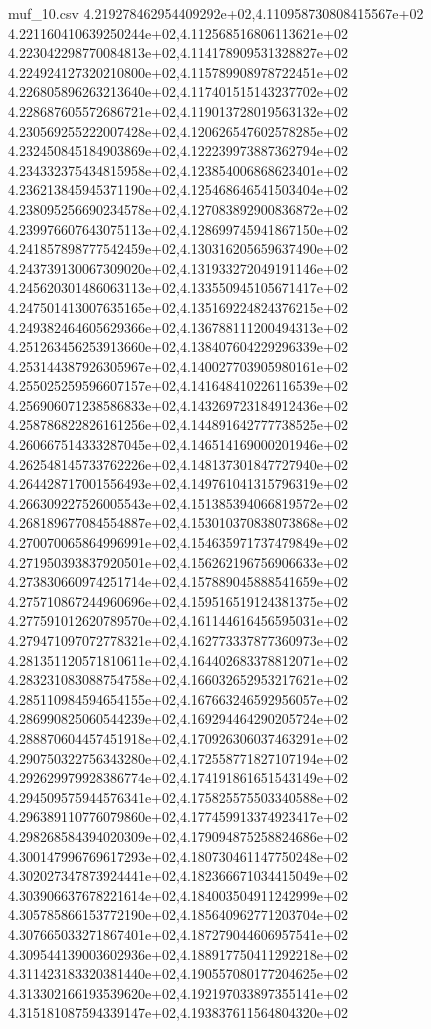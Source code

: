 \begin{filecontents*}{muf_10.csv}
4.219278462954409292e+02,4.110958730808415567e+02
4.221160410639250244e+02,4.112568516806113621e+02
4.223042298770084813e+02,4.114178909531328827e+02
4.224924127320210800e+02,4.115789908978722451e+02
4.226805896263213640e+02,4.117401515143237702e+02
4.228687605572686721e+02,4.119013728019563132e+02
4.230569255222007428e+02,4.120626547602578285e+02
4.232450845184903869e+02,4.122239973887362794e+02
4.234332375434815958e+02,4.123854006868623401e+02
4.236213845945371190e+02,4.125468646541503404e+02
4.238095256690234578e+02,4.127083892900836872e+02
4.239976607643075113e+02,4.128699745941867150e+02
4.241857898777542459e+02,4.130316205659637490e+02
4.243739130067309020e+02,4.131933272049191146e+02
4.245620301486063113e+02,4.133550945105671417e+02
4.247501413007635165e+02,4.135169224824376215e+02
4.249382464605629366e+02,4.136788111200494313e+02
4.251263456253913660e+02,4.138407604229296339e+02
4.253144387926305967e+02,4.140027703905980161e+02
4.255025259596607157e+02,4.141648410226116539e+02
4.256906071238586833e+02,4.143269723184912436e+02
4.258786822826161256e+02,4.144891642777738525e+02
4.260667514333287045e+02,4.146514169000201946e+02
4.262548145733762226e+02,4.148137301847727940e+02
4.264428717001556493e+02,4.149761041315796319e+02
4.266309227526005543e+02,4.151385394066819572e+02
4.268189677084554887e+02,4.153010370838073868e+02
4.270070065864996991e+02,4.154635971737479849e+02
4.271950393837920501e+02,4.156262196756906633e+02
4.273830660974251714e+02,4.157889045888541659e+02
4.275710867244960696e+02,4.159516519124381375e+02
4.277591012620789570e+02,4.161144616456595031e+02
4.279471097072778321e+02,4.162773337877360973e+02
4.281351120571810611e+02,4.164402683378812071e+02
4.283231083088754758e+02,4.166032652953217621e+02
4.285110984594654155e+02,4.167663246592956057e+02
4.286990825060544239e+02,4.169294464290205724e+02
4.288870604457451918e+02,4.170926306037463291e+02
4.290750322756343280e+02,4.172558771827107194e+02
4.292629979928386774e+02,4.174191861651543149e+02
4.294509575944576341e+02,4.175825575503340588e+02
4.296389110776079860e+02,4.177459913374923417e+02
4.298268584394020309e+02,4.179094875258824686e+02
4.300147996769617293e+02,4.180730461147750248e+02
4.302027347873924441e+02,4.182366671034415049e+02
4.303906637678221614e+02,4.184003504911242999e+02
4.305785866153772190e+02,4.185640962771203704e+02
4.307665033271867401e+02,4.187279044606957541e+02
4.309544139003602936e+02,4.188917750411292218e+02
4.311423183320381440e+02,4.190557080177204625e+02
4.313302166193539620e+02,4.192197033897355141e+02
4.315181087594339147e+02,4.193837611564804320e+02

\end{filecontents*}
